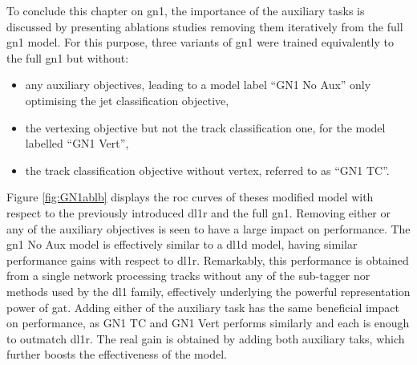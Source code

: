 To conclude this chapter on \gls{gn1}, the importance of the auxiliary tasks is discussed by presenting ablations studies removing them iteratively from the full \gls{gn1} model. For this purpose, three variants of \gls{gn1} were trained equivalently to the full \gls{gn1} but without:
\begin{itemize}
  \item any auxiliary objectives, leading to a model label ``GN1 No Aux'' only optimising the jet classification objective,
  \item the vertexing objective but not the track classification one, for the model labelled ``GN1 Vert'',
  \item the track classification objective without vertex, referred to as ``GN1 TC''.
\end{itemize}
Figure \ref{fig:GN1ablb} displays the \gls{roc} curves of theses modified model with respect to the previously introduced \gls{dl1r} and the full \gls{gn1}. Removing either or any of the auxiliary objectives is seen to have a large impact on performance. The \gls{gn1} No Aux model is effectively similar to a \gls{dl1d} model, having similar performance gains with respect to \gls{dl1r}. Remarkably, this performance is obtained from a single network processing tracks without any of the sub-tagger nor methods used by the \gls{dl1} family, effectively underlying the powerful representation power of \gls{gat}. Adding either of the auxiliary task has the same beneficial impact on performance, as GN1 TC and GN1 Vert performs similarly and each is enough to outmatch \gls{dl1r}. The real gain is obtained by adding both auxiliary taks, which further boosts the effectiveness of the model. 

